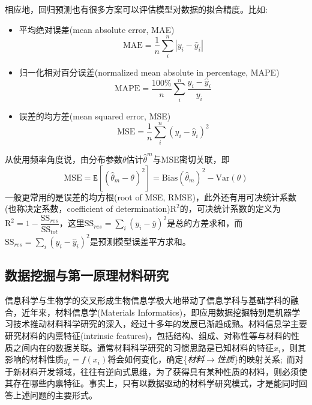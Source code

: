 相应地，回归预测也有很多方案可以评估模型对数据的拟合精度。比如:
\begin{itemize}
	\item 平均绝对误差\textrm{(mean absolute error, MAE)}
		\begin{displaymath}
			\mathrm{MAE}=\dfrac1n\sum_i^n|y_i-\hat{y}_i|
		\end{displaymath}
	\item 归一化相对百分误差\textrm{(normalized mean absolute in percentage, MAPE)}
		\begin{displaymath}
			\mathrm{MAPE}=\dfrac{100\%}n\sum_i^n\dfrac{y_i-\hat{y}_i}{y_i}
		\end{displaymath}
	\item 误差的均方差\textrm{(mean squared error, MSE)}
		\begin{displaymath}
			\mathrm{MSE}=\dfrac1n\sum_i^n(y_i-\hat{y}_i)^2
		\end{displaymath} 
\end{itemize}
从使用频率角度说，由分布参数$\theta$估计$\hat{\theta}^m$与\textrm{MSE}密切关联，即
		\begin{displaymath}
			\mathrm{MSE}=\mathtt{E}[(\hat{\theta}_m-\theta)^2]=\mathrm{Bias}(\hat{\theta}_m)^2-\mathrm{Var}(\theta)
		\end{displaymath} 
		一般更常用的是误差的均方根\textrm{(root of MSE, RMSE)}，此外还有用可决统计系数(也称决定系数，\textrm{coefficient of determination})$\mathrm{R}^2$的，可决统计系数的定义为$\mathrm{R}^2=1-\dfrac{\mathrm{SS}_{res}}{\mathrm{SS}_{tot}}$，这里$\mathrm{SS}_{res}=\sum\limits_i(y_i-\bar{y})^2$是总的方差求和，而$\mathrm{SS}_{res}=\sum\limits_i(y_i-\hat{y}_i)^2$是预测模型误差平方求和。


\subsection{数据挖掘与第一原理材料研究}
信息科学与生物学的交叉形成生物信息学极大地带动了信息学科与基础学科的融合，近年来，材料信息学\textrm{(Materials Informatics)}，即应用数据挖掘特别是机器学习技术推动材料科学研究的深入，经过十多年的发展已渐趋成熟\cite{MT8-38_2005}。材料信息学主要研究材料的内禀特征\textrm{(intrinsic features)}，包括结构、组成、对称性等与材料的性质之间内在的数据关联。通常材料科学研究的习惯思路是已知材料的特征$x_i$，则其影响的材料性质$y_i=f(x_i)$将会如何变化，确定\{\textit{材料}$\rightarrow$\textit{性质}\}的映射关系;~而对于新材料开发领域，往往有逆向式思维，为了获得具有某种性质的材料，则必须使其存在哪些内禀特征。事实上，只有以数据驱动的材料学研究模式，才是能同时回答上述问题的主要形式。

